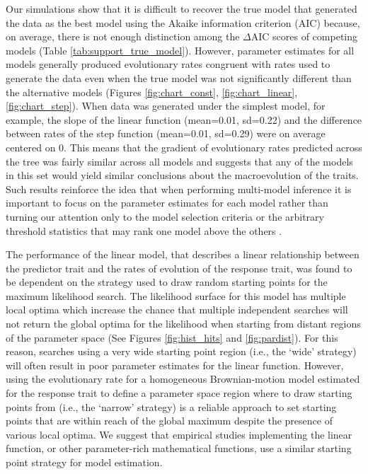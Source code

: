 Our simulations show that it is difficult to recover the true model that generated the data as the best model using the Akaike information criterion (AIC) because, on average, there is not enough distinction among the $\Delta$AIC scores of competing models (Table \ref{tab:support_true_model}). However, parameter estimates for all models generally produced evolutionary rates congruent with rates used to generate the data even when the true model was not significantly different than the alternative models (Figures \ref{fig:chart_const}, \ref{fig:chart_linear}, \ref{fig:chart_step}). When data was generated under the simplest model, for example, the slope of the linear function (mean=0.01, sd=0.22) and the difference between rates of the step function (mean=0.01, sd=0.29) were on average centered on 0. This means that the gradient of evolutionary rates predicted across the tree was fairly similar across all models and suggests that any of the models in this set would yield similar conclusions about the macroevolution of the traits. Such results reinforce the idea that when performing multi-model inference it is important to focus on the parameter estimates for each model rather than turning our attention only to the model selection criteria or the arbitrary threshold statistics that may rank one model above the others \citep{caetano_sysbio_2017}.

The performance of the linear model, that describes a linear relationship between the predictor trait and the rates of evolution of the response trait, was found to be dependent on the strategy used to draw random starting points for the maximum likelihood search. The likelihood surface for this model has multiple local optima which increase the chance that multiple independent searches will not return the global optima for the likelihood when starting from distant regions of the parameter space (See Figures \ref{fig:hist_hits} and \ref{fig:pardist}). For this reason, searches using a very wide starting point region (i.e., the `wide' strategy) will often result in poor parameter estimates for the linear function. However, using the evolutionary rate for a homogeneous Brownian-motion model estimated for the response trait to define a parameter space region where to draw starting points from (i.e., the `narrow' strategy) is a reliable approach to set starting points that are within reach of the global maximum despite the presence of various local optima. We suggest that empirical studies implementing the linear function, or other parameter-rich mathematical functions, use a similar starting point strategy for model estimation.

